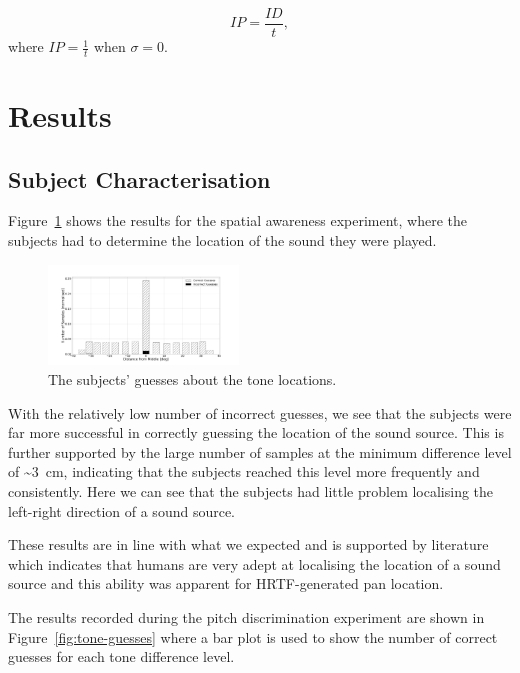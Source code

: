 \documentclass[format=sigconf, review=true, screen=true, anonymous=true]{acmart}
\begin{document}
\begin{equation}
  \label{eq:fitts-performance}
  IP = \frac{ID}{t},
\end{equation}
\noindent
where $IP = \frac{1}{t}$ when $\sigma=0$.

\section{Results}
\label{sec:results}

\subsection{Subject Characterisation}
\label{sec:character}

Figure~\ref{fig:location-guesses} shows the results for the spatial awareness experiment, where the subjects had to determine the location of the sound they were played. 

\begin{figure}
  \centering
  \includegraphics[width=0.45\textwidth]{figures/location_guesses.png}
  \caption{The subjects' guesses about the tone locations.}
  \label{fig:location-guesses}
\end{figure}

With the relatively low number of incorrect guesses, we see that the subjects were far more successful in correctly guessing the location of the sound source. This is further supported by the large number of samples at the minimum difference level of \textasciitilde\SI{3}{\cm}, indicating that the subjects reached this level more frequently and consistently. Here we can see that the subjects had little problem localising the left-right direction of a sound source. 

These results are in line with what we expected and is supported by literature which indicates that humans are very adept at localising the location of a sound source and this ability was apparent for HRTF-generated pan location. 

The results recorded during the pitch discrimination experiment are shown in Figure~\ref{fig:tone-guesses} where a bar plot is used to show the number of correct guesses for each tone difference level. 
\end{document}
